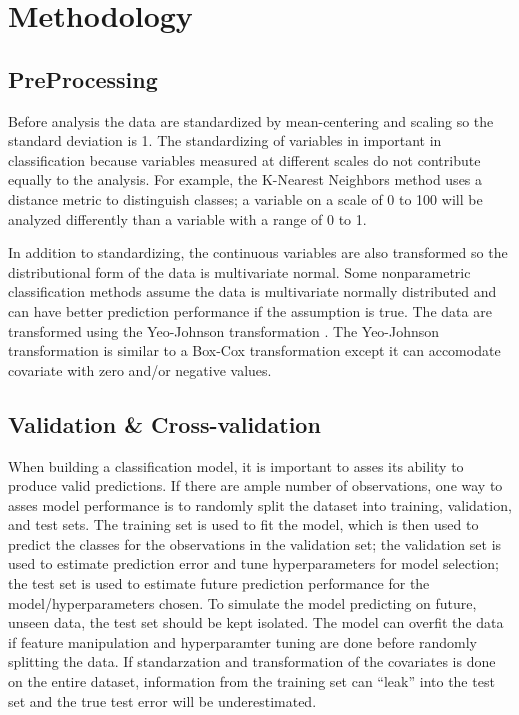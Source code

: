 \documentclass[12pt,]{article}
\begin{document}
\newpage

\section{Methodology}\label{methodology}

\subsection{PreProcessing}\label{preprocessing}

Before analysis the data are standardized by mean-centering and scaling
so the standard deviation is 1. The standardizing of variables in
important in classification because variables measured at different
scales do not contribute equally to the analysis. For example, the
K-Nearest Neighbors method uses a distance metric to distinguish
classes; a variable on a scale of 0 to 100 will be analyzed differently
than a variable with a range of 0 to 1.

In addition to standardizing, the continuous variables are also
transformed so the distributional form of the data is multivariate
normal. Some nonparametric classification methods assume the data is
multivariate normally distributed and can have better prediction
performance if the assumption is true. The data are transformed using
the Yeo-Johnson transformation \citep{yeo_new_2000}. The Yeo-Johnson
transformation is similar to a Box-Cox transformation except it can
accomodate covariate with zero and/or negative values.

\subsection{Validation \&
Cross-validation}\label{validation-cross-validation}

When building a classification model, it is important to asses its
ability to produce valid predictions. If there are ample number of
observations, one way to asses model performance is to randomly split
the dataset into training, validation, and test sets. The training set
is used to fit the model, which is then used to predict the classes for
the observations in the validation set; the validation set is used to
estimate prediction error and tune hyperparameters for model selection;
the test set is used to estimate future prediction performance for the
model/hyperparameters chosen. To simulate the model predicting on
future, unseen data, the test set should be kept isolated. The model can
overfit the data if feature manipulation and hyperparamter tuning are
done before randomly splitting the data. If standarzation and
transformation of the covariates is done on the entire dataset,
information from the training set can ``leak'' into the test set and the
true test error will be underestimated.
\end{document}
